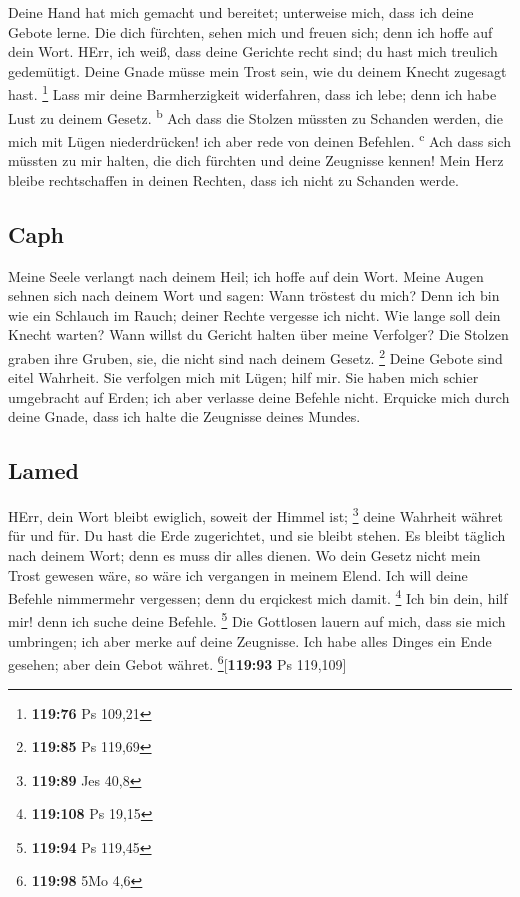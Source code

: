  Deine Hand hat mich gemacht und bereitet; unterweise
mich, dass ich deine Gebote lerne.  Die dich fürchten,
sehen mich und freuen sich; denn ich hoffe auf dein Wort.
 HErr, ich weiß, dass deine Gerichte recht sind; du hast
mich treulich gedemütigt.  Deine Gnade müsse mein Trost
sein, wie du deinem Knecht zugesagt hast. \footnote{\textbf{119:76} Ps
  109,21}  Lass mir deine Barmherzigkeit widerfahren,
dass ich lebe; denn ich habe Lust zu deinem Gesetz. \textsuperscript{b}
 Ach dass die Stolzen müssten zu Schanden werden, die
mich mit Lügen niederdrücken! ich aber rede von deinen Befehlen.
\textsuperscript{c}  Ach dass sich müssten zu mir halten,
die dich fürchten und deine Zeugnisse kennen!  Mein Herz
bleibe rechtschaffen in deinen Rechten, dass ich nicht zu Schanden
werde.

\hypertarget{caph}{%
\subsection{Caph}\label{caph}}

 Meine Seele verlangt nach deinem Heil; ich hoffe auf
dein Wort.  Meine Augen sehnen sich nach deinem Wort und
sagen: Wann tröstest du mich?  Denn ich bin wie ein
Schlauch im Rauch; deiner Rechte vergesse ich nicht.  Wie
lange soll dein Knecht warten? Wann willst du Gericht halten über meine
Verfolger?  Die Stolzen graben ihre Gruben, sie, die
nicht sind nach deinem Gesetz. \footnote{\textbf{119:85} Ps 119,69}
 Deine Gebote sind eitel Wahrheit. Sie verfolgen mich mit
Lügen; hilf mir.  Sie haben mich schier umgebracht auf
Erden; ich aber verlasse deine Befehle nicht.  Erquicke
mich durch deine Gnade, dass ich halte die Zeugnisse deines Mundes.

\hypertarget{lamed}{%
\subsection{Lamed}\label{lamed}}

 HErr, dein Wort bleibt ewiglich, soweit der Himmel ist;
\footnote{\textbf{119:89} Jes 40,8}  deine Wahrheit
währet für und für. Du hast die Erde zugerichtet, und sie bleibt stehen.
 Es bleibt täglich nach deinem Wort; denn es muss dir
alles dienen.  Wo dein Gesetz nicht mein Trost gewesen
wäre, so wäre ich vergangen in meinem Elend.  Ich will
deine Befehle nimmermehr vergessen; denn du erqickest mich damit.
\footnote{\textbf{119:108} Ps 19,15}  Ich bin dein, hilf
mir! denn ich suche deine Befehle. \footnote{\textbf{119:94} Ps 119,45}
 Die Gottlosen lauern auf mich, dass sie mich umbringen;
ich aber merke auf deine Zeugnisse.  Ich habe alles
Dinges ein Ende gesehen; aber dein Gebot währet.
\footnote{\textbf{119:98} 5Mo 4,6}{[}\textbf{119:93} Ps 119,109{]}


